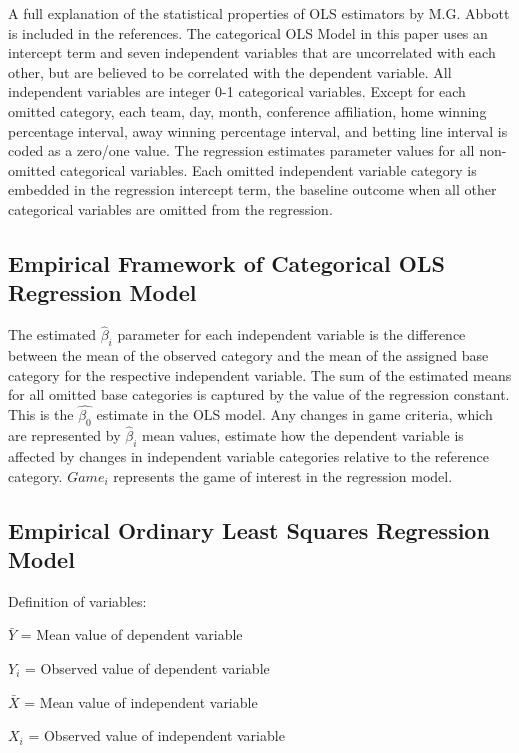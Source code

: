 \documentclass[preprint,12pt,times]{elsarticle}
\begin{document}
A full explanation of the statistical properties of OLS estimators by M.G. Abbott is included in the references.  The categorical OLS Model in this paper uses an intercept term and seven independent variables that are uncorrelated with each other, but are believed to be correlated with the dependent variable.  All independent variables are integer 0-1 categorical variables.  Except for each omitted category, each team, day, month, conference affiliation, home winning percentage interval, away winning percentage interval, and betting line interval is coded as a zero/one value.  The regression estimates parameter values for all non-omitted categorical variables. Each omitted independent variable category is embedded in the regression intercept term, the baseline outcome when all other categorical variables are omitted from  the regression.

\begin{large}
\section{\textbf{Empirical Framework of Categorical OLS Regression Model}}
\end{large}

The estimated $\hat{\beta}_i$ parameter for each independent variable is the difference between the mean of the observed category and the mean of the assigned base category for the respective independent variable.  The sum of the estimated means for all omitted base categories is captured by the value of the regression constant.  This is the $\hat{\beta_0}$ estimate in the OLS model.  Any changes in game criteria, which are represented by $\hat{\beta}_i$ mean values, estimate how the dependent variable is affected by changes in independent variable categories relative to the reference category.  $Game_i$ represents the game of interest in the regression model.

\subsection{
\textbf{Empirical Ordinary Least Squares Regression Model}
}

\noindent Definition of variables:

$\bar{Y}$ = Mean value of dependent variable

$Y_i$ = Observed value of dependent variable

$\bar{X}$ = Mean value of independent variable

$X_i$ = Observed value of independent variable
\end{document}
